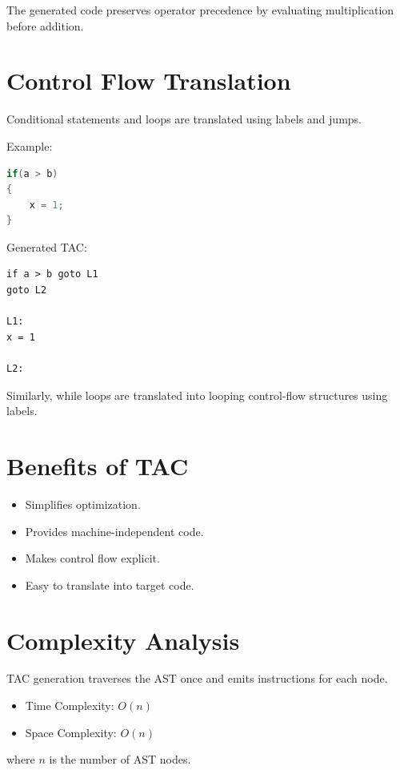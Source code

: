 \documentclass[12pt,a4paper]{report}
\begin{document}
The generated code preserves operator precedence by evaluating multiplication before addition.

\section{Control Flow Translation}

Conditional statements and loops are translated using labels and jumps.

Example:

\begin{lstlisting}[language=C]
if(a > b)
{
    x = 1;
}
\end{lstlisting}

Generated TAC:

\begin{lstlisting}
if a > b goto L1
goto L2

L1:
x = 1

L2:
\end{lstlisting}

Similarly, while loops are translated into looping control-flow structures using labels.

\section{Benefits of TAC}

\begin{itemize}
    \item Simplifies optimization.
    \item Provides machine-independent code.
    \item Makes control flow explicit.
    \item Easy to translate into target code.
\end{itemize}

\section{Complexity Analysis}

TAC generation traverses the AST once and emits instructions for each node.

\begin{itemize}
    \item Time Complexity: \(O(n)\)
    \item Space Complexity: \(O(n)\)
\end{itemize}

where \(n\) is the number of AST nodes.
\end{document}
